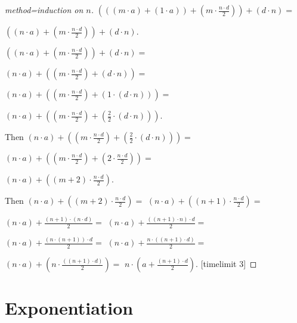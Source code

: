 \documentclass{article}
\begin{document}
\begin{forthel}
\begin{proof}[method=induction on $n$]
$(((m \cdot a) + (1 \cdot a)) +  (m \cdot \frac{n \cdot d}{2})) + (d \cdot n) =$

$((n \cdot a) +  (m \cdot \frac{n \cdot d}{2})) + (d \cdot n)$.

$((n \cdot a) +  (m \cdot \frac{n \cdot d}{2})) + (d \cdot n) =$

$(n \cdot a) +  ((m \cdot \frac{n \cdot d}{2}) + (d \cdot n))=$

$(n \cdot a) +  ((m \cdot \frac{n \cdot d}{2}) + (1 \cdot (d \cdot n)))=$

$(n \cdot a) +  ((m \cdot \frac{n \cdot d}{2}) + (\frac{2}{2} \cdot (d \cdot n)))$.

Then $(n \cdot a) +  ((m \cdot \frac{n \cdot d}{2}) + (\frac{2}{2} \cdot (d \cdot n))) =$

$(n \cdot a) +  ((m \cdot \frac{n \cdot d}{2}) + (2 \cdot \frac{n \cdot d}{2})) =$

$(n \cdot a) +  ((m +2) \cdot \frac{n \cdot d}{2})$.

Then $(n \cdot a) + ((m +2) \cdot \frac{n \cdot d}{2}) =$
$(n \cdot a) +  ((n+1) \cdot \frac{n \cdot d}{2}) =$

$(n \cdot a) +  \frac{(n+1) \cdot (n \cdot d)}{2} =$
$(n \cdot a) +  \frac{((n+1) \cdot n) \cdot d}{2} =$

$(n \cdot a) +  \frac{(n \cdot (n+1)) \cdot d}{2} =$
$(n \cdot a) +  \frac{n \cdot ((n+1) \cdot d)}{2} =$

$(n \cdot a) +  (n \cdot \frac{((n+1) \cdot d)}{2}) =$
$n \cdot ( a + \frac{(n + 1) \cdot d}{2})$.
[timelimit 3]
\end{proof}
\end{forthel}


\section{Exponentiation}
\end{document}
